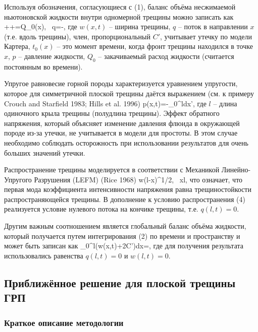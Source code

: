 \documentclass[main.tex]{subfiles}
\begin{document}
Используя обозначения, согласующиеся с (1), баланс объёма несжимаемой ньютоновской жидкости внутри одномерной трещины можно записать как
\beq
{}++=Q_0\delta(x),\,\,\,\,\,q=-,
\eeq
где $w(x,t)$ -- ширина трещины,
$q$ -- поток в направлении $x$ (т.е. вдоль трещины),
член, пропорциональный $C'$, учитывает утечку по модели Картера, $t_0(x)$ -- это момент времени, когда фронт трещины находился в точке $x$,
$p$ -- давление жидкости,
$Q_0$ -- закачиваемый расход жидкости (считается постоянным во времени).

Упругое равновесие горной породы характеризуется уравнением упругости, которое для симметричной плоской трещины даётся выражением (см. к примеру Crouch and Starfield 1983; Hills et al. 1996)
\beq
p(x,t)=-\int\limits_{0}^{l}{}dx',
\eeq
где $l$ -- длина одиночного крыла трещины (полудлина трещины).
Эффект обратного напряжения, который объясняет изменение давления флюида в окружающей породе из-за утечки, не учитывается в модели для простоты.
В этом случае необходимо соблюдать осторожность при использовании результатов для очень больших значений утечки.

Распространение трещины моделируется в соответствии с Механикой Линейно-Упругого Разрушения (LEFM) (Rice 1968)
\beq
w\to{}\left(l-x\right)^{1/2},\,\,\,\,\,x\to l,
\eeq
что означает, что первая мода коэффициента интенсивности напряжения равна трещиностойкости распространяющейся трещины.
В дополнение к условию распространения (4) реализуется условие нулевого потока на кончике трещины, т.е. $q(l,t)=0$.

Другим важным соотношением является глобальный баланс объёма жидкости, который получается путем интегрирования (2) по времени и пространству и может быть записан как
\beq
\int\limits_{0}^{l}{\left(w(x,t)+2C'\right)dx}=,
\eeq
где для получения результата использовались равенства $q(l,t)=0$ и $w(l,t)=0$.

\subsection{Приближённое решение для плоской трещины ГРП}

\subsubsection{Краткое описание методологии}
\end{document}
